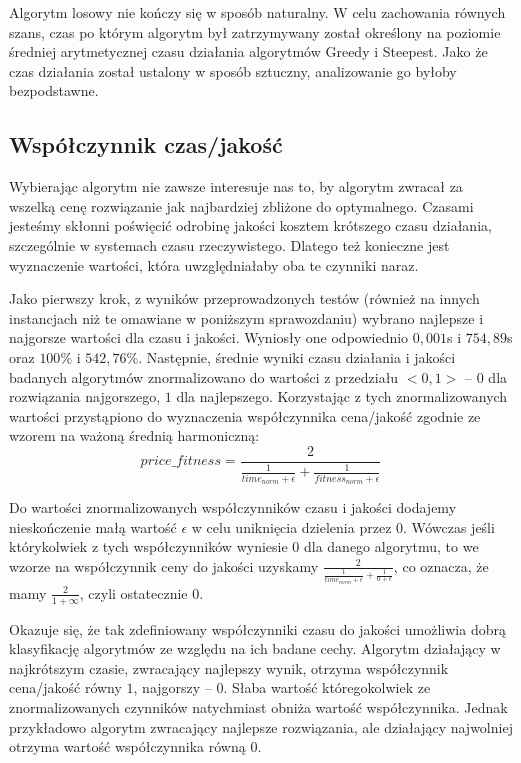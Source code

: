 Algorytm losowy nie kończy się w sposób naturalny. W celu zachowania równych szans, czas po którym algorytm był zatrzymywany został określony na poziomie średniej arytmetycznej czasu działania algorytmów Greedy i Steepest. Jako że czas działania został ustalony w sposób sztuczny, analizowanie go byłoby bezpodstawne.

\subsection{Współczynnik czas/jakość}
Wybierając algorytm nie zawsze interesuje nas to, by algorytm zwracał za wszelką cenę rozwiązanie jak najbardziej zbliżone do optymalnego. Czasami jesteśmy skłonni poświęcić odrobinę jakości kosztem krótszego czasu działania, szczególnie w systemach czasu rzeczywistego. Dlatego też konieczne jest wyznaczenie wartości, która uwzględniałaby oba te czynniki naraz.

Jako pierwszy krok, z wyników przeprowadzonych testów (również na innych instancjach niż te omawiane w poniższym sprawozdaniu) wybrano najlepsze i najgorsze wartości dla czasu i jakości. Wyniosły one odpowiednio $0,001$s i $754,89$s oraz $100\%$ i $542,76\%$. Następnie, średnie wyniki czasu działania i jakości badanych algorytmów znormalizowano do wartości z przedziału $<0,1>$ -- $0$ dla rozwiązania najgorszego, $1$ dla najlepszego. Korzystając z tych znormalizowanych wartości przystąpiono do wyznaczenia współczynnika cena/jakość zgodnie ze wzorem na ważoną średnią harmoniczną:
\begin{equation*}
price\_fitness = \frac{2}{\frac{1}{time_{norm} + \epsilon} + \frac{1}{fitness_{norm} + \epsilon} }
\end{equation*}

Do wartości znormalizowanych współczynników czasu i jakości dodajemy nieskończenie małą wartość $\epsilon$ w celu uniknięcia dzielenia przez 0. Wówczas jeśli którykolwiek z tych współczynników wyniesie $0$ dla danego algorytmu, to we wzorze na współczynnik ceny do jakości uzyskamy $\frac{2}{\frac{1}{time_{norm} + \epsilon} + \frac{1}{0 + \epsilon}}$, co oznacza, że mamy $\frac{2}{1 + \infty}$, czyli ostatecznie $0$.

 Okazuje się, że tak zdefiniowany współczynniki czasu do jakości umożliwia dobrą klasyfikację algorytmów ze względu na ich badane cechy. Algorytm działający w najkrótszym czasie, zwracający najlepszy wynik, otrzyma współczynnik cena/jakość równy $1$, najgorszy -- $0$. Słaba wartość któregokolwiek ze znormalizowanych czynników natychmiast obniża wartość współczynnika. Jednak przykładowo algorytm zwracający najlepsze rozwiązania, ale działający najwolniej otrzyma wartość współczynnika równą 0.

